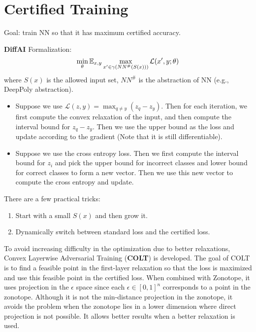 \section{Certified Training}

Goal: train NN so that it has maximum certified accuracy.

\textbf{DiffAI} Formalization: 
$$\min_\theta \mathbb{E}_{x,y} \max_{x^\prime\in \gamma(NN^{\#}(S(x)))} \mathcal{L}(x^\prime, y;\theta)$$
where $S(x)$ is the allowed input set, $NN^{\#}$ is the abstraction of NN (e.g., DeepPoly abstraction). 
\begin{itemize}
    \item Suppose we use $\mathcal{L}(z, y) = \max_{q\ne y}(z_q-z_y)$. Then for each iteration, we first compute the convex relaxation of the input, and then compute the interval bound for $z_q-z_y$. Then we use the upper bound as the loss and update according to the gradient (Note that it is still differentiable).
    \item Suppose we use the cross entropy loss. Then we first compute the interval bound for $z_i$ and pick the upper bound for incorrect classes and lower bound for correct classes to form a new vector. Then we use this new vector to compute the cross entropy and update.
\end{itemize}
There are a few practical tricks:
\begin{enumerate}
    \item Start with a small $S(x)$ and then grow it.
    \item Dynamically switch between standard loss and the certified loss.
\end{enumerate}

To avoid increasing difficulty in the optimization due to better relaxations, Convex Layerwise Adversarial Training (\textbf{COLT}) is developed. The goal of COLT is to find a feasible point in the first-layer relaxation so that the loss is maximized and use this feasible point in the certified loss. When combined with Zonotope, it uses projection in the $\epsilon$ space since each $\epsilon \in [0,1]^n$ corresponds to a point in the zonotope. Although it is not the min-distance projection in the zonotope, it avoids the problem when the zonotope lies in a lower dimension where direct projection is not possible. It allows better results when a better relaxation is used.